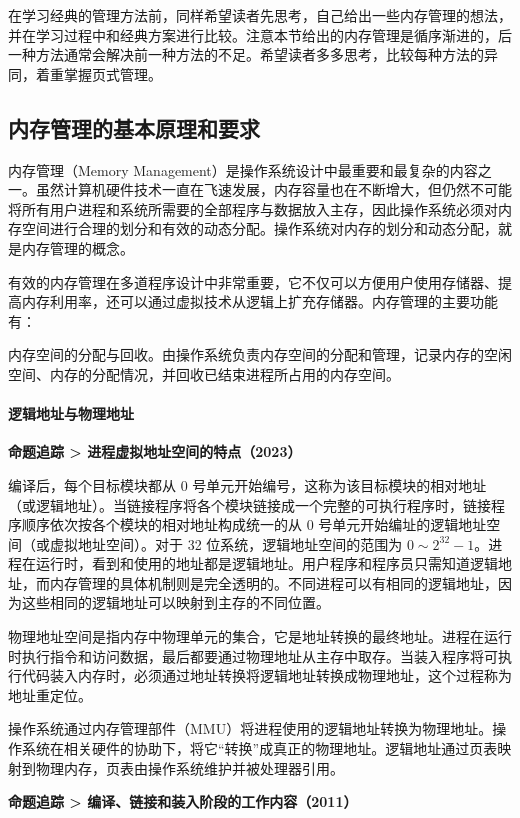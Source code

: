 \documentclass{ctexbook}
\begin{document}
	在学习经典的管理方法前，同样希望读者先思考，自己给出一些内存管理的想法，并在学习过程中和经典方案进行比较。注意本节给出的内存管理是循序渐进的，后一种方法通常会解决前一种方法的不足。希望读者多多思考，比较每种方法的异同，着重掌握页式管理。
	
	\subsection{内存管理的基本原理和要求}
	
	内存管理（Memory Management）是操作系统设计中最重要和最复杂的内容之一。虽然计算机硬件技术一直在飞速发展，内存容量也在不断增大，但仍然不可能将所有用户进程和系统所需要的全部程序与数据放入主存，因此操作系统必须对内存空间进行合理的划分和有效的动态分配。操作系统对内存的划分和动态分配，就是内存管理的概念。
	
	有效的内存管理在多道程序设计中非常重要，它不仅可以方便用户使用存储器、提高内存利用率，还可以通过虚拟技术从逻辑上扩充存储器。内存管理的主要功能有：
	
	
内存空间的分配与回收。由操作系统负责内存空间的分配和管理，记录内存的空闲空间、内存的分配情况，并回收已结束进程所占用的内存空间。
	
	\paragraph{逻辑地址与物理地址}
	
	\textbf{命题追踪 > 进程虚拟地址空间的特点（2023）}
	
	编译后，每个目标模块都从 0 号单元开始编号，这称为该目标模块的相对地址（或逻辑地址）。当链接程序将各个模块链接成一个完整的可执行程序时，链接程序顺序依次按各个模块的相对地址构成统一的从 0 号单元开始编址的逻辑地址空间（或虚拟地址空间）。对于 32 位系统，逻辑地址空间的范围为 $0 \sim 2^{32} - 1$。进程在运行时，看到和使用的地址都是逻辑地址。用户程序和程序员只需知道逻辑地址，而内存管理的具体机制则是完全透明的。不同进程可以有相同的逻辑地址，因为这些相同的逻辑地址可以映射到主存的不同位置。
	
	物理地址空间是指内存中物理单元的集合，它是地址转换的最终地址。进程在运行时执行指令和访问数据，最后都要通过物理地址从主存中取存。当装入程序将可执行代码装入内存时，必须通过地址转换将逻辑地址转换成物理地址，这个过程称为地址重定位。
	
	操作系统通过内存管理部件（MMU）将进程使用的逻辑地址转换为物理地址。操作系统在相关硬件的协助下，将它“转换”成真正的物理地址。逻辑地址通过页表映射到物理内存，页表由操作系统维护并被处理器引用。
	
	\textbf{命题追踪 > 编译、链接和装入阶段的工作内容（2011）}
	
\end{document}
